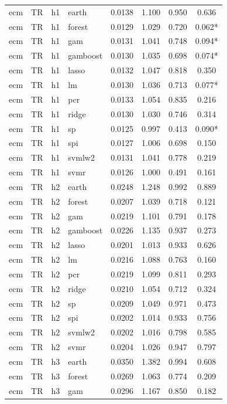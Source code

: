 \begin{ThreePartTable}
\begin{longtable}[t]{llclcccc}
\addlinespace
ecm & TR & h1 & earth & 0.0138 & 1.100 & 0.950 & 0.636\\
ecm & TR & h1 & forest & 0.0129 & 1.029 & 0.720 & 0.062*\\
ecm & TR & h1 & gam & 0.0131 & 1.041 & 0.748 & 0.094*\\
ecm & TR & h1 & gamboost & 0.0130 & 1.035 & 0.698 & 0.074*\\
ecm & TR & h1 & lasso & 0.0132 & 1.047 & 0.818 & 0.350\\
ecm & TR & h1 & lm & 0.0130 & 1.036 & 0.713 & 0.077*\\
ecm & TR & h1 & pcr & 0.0133 & 1.054 & 0.835 & 0.216\\
ecm & TR & h1 & ridge & 0.0130 & 1.030 & 0.746 & 0.314\\
ecm & TR & h1 & sp & 0.0125 & 0.997 & 0.413 & 0.090*\\
ecm & TR & h1 & spi & 0.0127 & 1.006 & 0.698 & 0.150\\
ecm & TR & h1 & svmlw2 & 0.0131 & 1.041 & 0.778 & 0.219\\
ecm & TR & h1 & svmr & 0.0126 & 1.000 & 0.491 & 0.161\\
\addlinespace
ecm & TR & h2 & earth & 0.0248 & 1.248 & 0.992 & 0.889\\
ecm & TR & h2 & forest & 0.0207 & 1.039 & 0.718 & 0.121\\
ecm & TR & h2 & gam & 0.0219 & 1.101 & 0.791 & 0.178\\
ecm & TR & h2 & gamboost & 0.0226 & 1.135 & 0.937 & 0.273\\
ecm & TR & h2 & lasso & 0.0201 & 1.013 & 0.933 & 0.626\\
ecm & TR & h2 & lm & 0.0216 & 1.088 & 0.763 & 0.160\\
ecm & TR & h2 & pcr & 0.0219 & 1.099 & 0.811 & 0.293\\
ecm & TR & h2 & ridge & 0.0210 & 1.054 & 0.712 & 0.324\\
ecm & TR & h2 & sp & 0.0209 & 1.049 & 0.971 & 0.473\\
ecm & TR & h2 & spi & 0.0202 & 1.014 & 0.933 & 0.756\\
ecm & TR & h2 & svmlw2 & 0.0202 & 1.016 & 0.798 & 0.585\\
ecm & TR & h2 & svmr & 0.0204 & 1.026 & 0.947 & 0.797\\
\addlinespace
ecm & TR & h3 & earth & 0.0350 & 1.382 & 0.994 & 0.608\\
ecm & TR & h3 & forest & 0.0269 & 1.063 & 0.774 & 0.209\\
ecm & TR & h3 & gam & 0.0296 & 1.167 & 0.850 & 0.182\\

\end{longtable}
\end{ThreePartTable}
